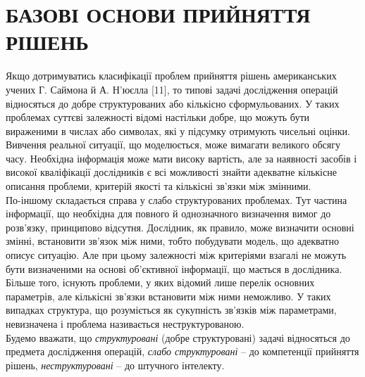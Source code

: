 \section{БАЗОВІ ОСНОВИ ПРИЙНЯТТЯ РІШЕНЬ}

Якщо дотримуватись класифікації проблем прийняття рішень американських учених Г. Саймона й А. Н'юєлла [11], то типові задачі дослідження операцій відносяться до добре структурованих або кількісно сформульованих. У таких проблемах суттєві залежності відомі настільки добре, що можуть бути вираженими в числах або символах, які у підсумку отримують чисельні оцінки. Вивчення реальної ситуації, що моделюється, може вимагати великого обсягу часу. Необхідна інформація може мати високу вартість, але за наявності засобів і високої кваліфікації дослідників є всі можливості знайти адекватне кількісне описання проблеми, критерій якості та кількісні зв'язки між змінними. \\

По-іншому складається справа у слабо структурованих проблемах. Тут частина інформації, що необхідна для повного й однозначного визначення вимог до розв'язку, принципово відсутня. Дослідник, як правило, може визначити основні змінні, встановити зв'язок між ними, тобто побудувати модель, що адекватно описує ситуацію. Але при цьому залежності між критеріями взагалі не можуть бути визначеними на основі об'єктивної інформації, що мається в дослідника. \\

Більше того, існують проблеми, у яких відомий лише перелік основних параметрів, але кількісні зв'язки встановити між ними неможливо. У таких випадках структура, що розуміється як сукупність зв'язків між параметрами, невизначена і проблема називається неструктурованою. \\

Будемо вважати, що \textit{структуровані} (добре структуровані) задачі відносяться до предмета дослідження операцій, \textit{слабо структуровані} -- до компетенції прийняття рішень, \textit{неструктуровані} -- до штучного інтелекту.
